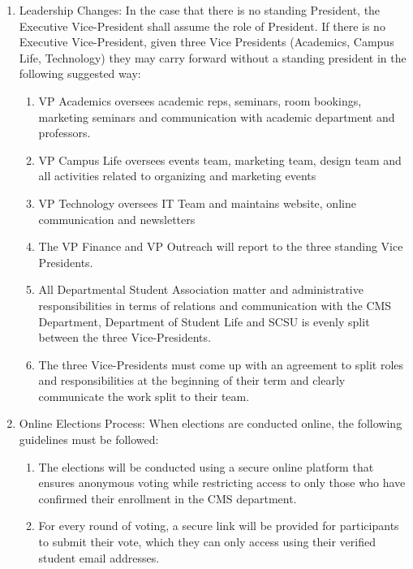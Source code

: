 \documentclass[12pt,a4paper]{article}
\begin{document}
\begin{enumerate}
\item Leadership Changes: In the case that there is no standing President, the Executive Vice-President shall assume the role of President. If there is no Executive Vice-President, given three Vice Presidents (Academics, Campus Life, Technology) they may carry forward without a standing president in the following suggested way:

\begin{enumerate}
\item VP Academics oversees academic reps, seminars, room bookings, marketing seminars and communication with academic department and professors.

\item VP Campus Life oversees events team, marketing team, design team and all activities related to organizing and marketing events

\item VP Technology oversees IT Team and maintains website, online communication and newsletters

\item The VP Finance and VP Outreach will report to the three standing Vice Presidents.

\item All Departmental Student Association matter and administrative responsibilities in terms of relations and communication with the CMS Department, Department of Student Life and SCSU is evenly split between the three Vice-Presidents.

\item The three Vice-Presidents must come up with an agreement to split roles and responsibilities at the beginning of their term and clearly communicate the work split to their team.
\end{enumerate}

\item Online Elections Process: When elections are conducted online, the following guidelines must be followed:

\begin{enumerate}
\item The elections will be conducted using a secure online platform that ensures anonymous voting while restricting access to only those who have confirmed their enrollment in the CMS department.

\item For every round of voting, a secure link will be provided for participants to submit their vote, which they can only access using their verified student email addresses.


\end{enumerate}
\end{enumerate}
\end{document}
